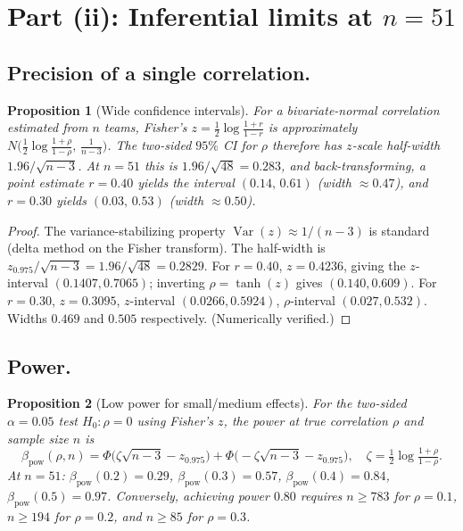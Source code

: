 \documentclass{amsart}
\newtheorem{proposition}{Proposition}
\theoremstyle{definition}
\begin{document}
\section*{Part (ii): Inferential limits at $n=51$}

\subsection*{Precision of a single correlation.}
\begin{proposition}[Wide confidence intervals]\label{prop:ci}
For a bivariate-normal correlation estimated from $n$ teams, Fisher's
$z=\tfrac12\log\frac{1+r}{1-r}$ is approximately $N\!\big(\tfrac12\log\frac{1+\rho}{1-\rho},\,\frac1{n-3}\big)$.
The two-sided $95\%$ CI for $\rho$ therefore has $z$-scale half-width
$1.96/\sqrt{n-3}$. At $n=51$ this is $1.96/\sqrt{48}=0.283$, and back-transforming,
a point estimate $r=0.40$ yields the interval $(0.14,\,0.61)$ (width $\approx0.47$),
and $r=0.30$ yields $(0.03,\,0.53)$ (width $\approx0.50$).
\end{proposition}

\begin{proof}
The variance-stabilizing property $\operatorname{Var}(z)\approx 1/(n-3)$ is
standard (delta method on the Fisher transform). The half-width is
$z_{0.975}/\sqrt{n-3}=1.96/\sqrt{48}=0.2829$. For $r=0.40$,
$z=0.4236$, giving the $z$-interval $(0.1407,0.7065)$; inverting
$\rho=\tanh(z)$ gives $(0.140,0.609)$. For $r=0.30$, $z=0.3095$,
$z$-interval $(0.0266,0.5924)$, $\rho$-interval $(0.027,0.532)$. Widths
$0.469$ and $0.505$ respectively. (Numerically verified.)
\end{proof}

\subsection*{Power.}
\begin{proposition}[Low power for small/medium effects]\label{prop:power}
For the two-sided $\alpha=0.05$ test $H_0:\rho=0$ using Fisher's $z$, the
power at true correlation $\rho$ and sample size $n$ is
\[
  \beta_{\text{pow}}(\rho,n)
   =\Phi\!\Big(\zeta\sqrt{n-3}-z_{0.975}\Big)
   +\Phi\!\Big(-\zeta\sqrt{n-3}-z_{0.975}\Big),
   \quad \zeta=\tfrac12\log\tfrac{1+\rho}{1-\rho}.
\]
At $n=51$: $\beta_{\text{pow}}(0.2)=0.29$, $\beta_{\text{pow}}(0.3)=0.57$,
$\beta_{\text{pow}}(0.4)=0.84$, $\beta_{\text{pow}}(0.5)=0.97$.
Conversely, achieving power $0.80$ requires $n\ge 783$ for $\rho=0.1$,
$n\ge 194$ for $\rho=0.2$, and $n\ge 85$ for $\rho=0.3$.
\end{proposition}
\end{document}
